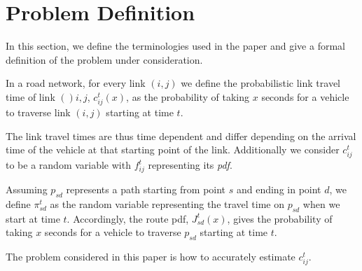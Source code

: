 \section{Problem Definition}
\label{sec:problemdef}
In this section, we define the terminologies used in the paper and give a formal definition of the problem under consideration.

\begin{definition} 
In a road network, for every link $(i, j)$ we define the probabilistic link travel time of link $()i,j$, $c_{ij}^t(x)$, as the probability of taking $x$ seconds for a vehicle to traverse link $(i,j)$ starting at time $t$.
\end{definition}

The link travel times are thus time dependent and differ depending on the arrival time of the vehicle at that starting point of the link. Additionally we consider $c_{ij}^t$ to be a random variable with $f_{ij}^t$ representing its \textit{pdf}.

\begin{definition} 
Assuming $p_{sd}$ represents a path starting from point $s$ and ending in point $d$, we define $\pi_{sd}^t$ as the random variable representing the travel time on $p_{sd}$ when we start at time $t$. Accordingly, the route pdf, $J_{sd}^t(x)$, gives the probability of taking $x$ seconds for a vehicle to traverse $p_{sd}$ starting at time $t$.
\end{definition}

The problem considered in this paper is how to  accurately estimate $c_{ij}^t$.


